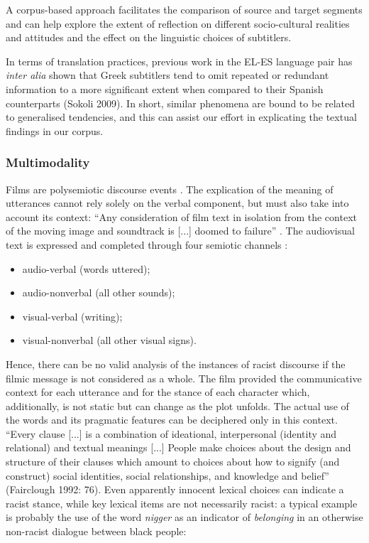 \documentclass[output=paper]{LSP/langsci}
\begin{document}
A corpus-based approach facilitates the comparison of source and target segments and can help explore the extent of reflection on different socio-cultural realities and attitudes and the effect on the linguistic choices of subtitlers.

In terms of translation practices, previous work in the EL-ES language pair has \textit{inter alia} shown that Greek subtitlers tend to omit repeated or redundant information to a more significant extent when compared to their Spanish counterparts (Sokoli 2009). In short, similar phenomena are bound to be related to generalised tendencies, and this can assist our effort in explicating the textual findings in our corpus.

\subsubsection{Multimodality}
Films are polysemiotic discourse events \citep{Gottlieb2005}. The explication of the meaning of utterances cannot rely solely on the verbal component, but must also take into account its context: “Any consideration of film text in isolation from the context of the moving image and soundtrack is [...] doomed to failure” \citep[23]{Mason2001}.
The audiovisual text is expressed and completed through four semiotic channels \citep{Zabalbeascoa2008}:

\begin{itemize}
\item audio-verbal (words uttered);
\item audio-nonverbal (all other sounds);
\item visual-verbal (writing);
\item visual-nonverbal (all other visual signs).
\end{itemize}

Hence, there can be no valid analysis of the instances of racist discourse if the filmic message is not considered as a whole. The film provided the communicative context for each utterance and for the stance of each character which, additionally, is not static but can change as the plot unfolds. The actual use of the words and its pragmatic features can be deciphered only in this context. “Every clause [...] is a combination of ideational, interpersonal (identity and relational) and textual meanings [...] People make choices about the design and structure of their clauses which amount to choices about how to signify (and construct) social identities, social relationships, and knowledge and belief” (Fairclough 1992: 76). Even apparently innocent lexical choices can indicate a racist stance, while key lexical items are not necessarily racist: a typical example is probably the use of the word \textit{nigger} as an indicator of \textit{belonging} in an otherwise non-racist dialogue between black people:
\end{document}
